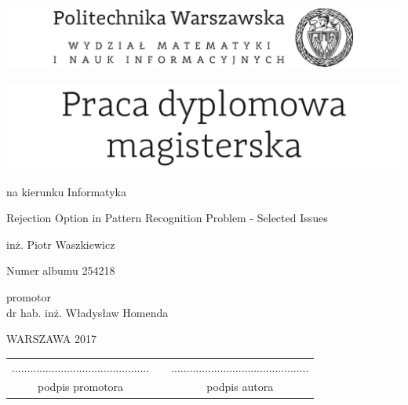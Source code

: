 \documentclass[12pt,twoside,a4paper]{article}
\def\discipline{Informatyka}
\def\title{Rejection Option in Pattern Recognition Problem - Selected Issues}
\def\author{inż. Piotr Waszkiewicz}
\def\supervisor{dr hab. inż. Władysław Homenda}
\def\album{254218}
\def\year{2017}
\begin{document}
\sloppy
\pagestyle{empty}



\includegraphics[scale=1.]{Figures/politechnika} 

\begin{center}
\vspace{70pt}


\includegraphics[scale=1.]{Figures/praca_mgr} %

{  na kierunku \discipline

\vspace{40pt}
{ \large \title}

\vspace{50pt}

{ \huge \author}

\vspace{5pt}

Numer albumu \album

\vspace{40pt}

promotor \\
{ \supervisor}

\vspace{15pt}
 

 \vfill
WARSZAWA \year \\
}
\end{center}


\newpage
\null

\vfill

\begin{center}
\begin{tabular}[t]{ccc}
............................................. & \hspace*{100pt} & .............................................\\
podpis promotora & \hspace*{100pt} & podpis autora
\end{tabular}
\end{center}
\end{document}
